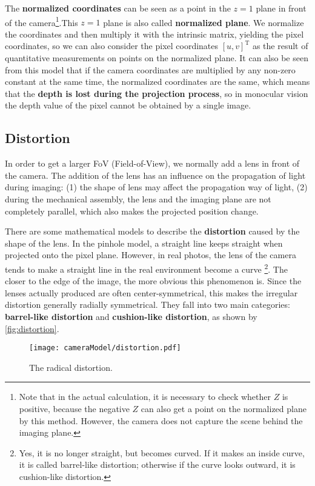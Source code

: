 The \textbf{normalized coordinates} can be seen as a point in the $z=1$ plane in front of the camera\footnote{Note that in the actual calculation, it is necessary to check whether $Z$ is positive, because the negative $Z$ can also get a point on the normalized plane by this method. However, the camera does not capture the scene behind the imaging plane. }.This $z=1$ plane is also called \textbf{normalized plane}. We normalize the coordinates and then multiply it with the intrinsic matrix, yielding the pixel coordinates, so we can also consider the pixel coordinates $[u,v]^\mathrm{T}$ as the result of quantitative measurements on points on the normalized plane. It can also be seen from this model that if the camera coordinates are multiplied by any non-zero constant at the same time, the normalized coordinates are the same, which means that the \textbf{depth is lost during the projection process}, so in monocular vision the depth value of the pixel cannot be obtained by a single image.

\subsection{Distortion}
In order to get a larger FoV (Field-of-View), we normally add a lens in front of the camera. The addition of the lens has an influence on the propagation of light during imaging: (1) the shape of lens may affect the propagation way of light, (2) during the mechanical assembly, the lens and the imaging plane are not completely parallel, which also makes the projected position change.

There are some mathematical models to describe the \textbf{distortion} caused by the shape of the lens. In the pinhole model, a straight line keeps straight when projected onto the pixel plane. However, in real photos, the lens of the camera tends to make a straight line in the real environment become a curve \footnote{Yes, it is no longer straight, but becomes curved. If it makes an inside curve, it is called barrel-like distortion; otherwise if the curve looks outward, it is cushion-like distortion. }. The closer to the edge of the image, the more obvious this phenomenon is. Since the lenses actually produced are often center-symmetrical, this makes the irregular distortion generally radially symmetrical. They fall into two main categories: \textbf{barrel-like distortion} and \textbf{cushion-like distortion}, as shown by \autoref{fig:distortion}.
\begin{figure}[!t]
	\centering
	\texttt{[image: cameraModel/distortion.pdf]}
	\caption{The radical distortion.}
	\label{fig:distortion}
\end{figure}

